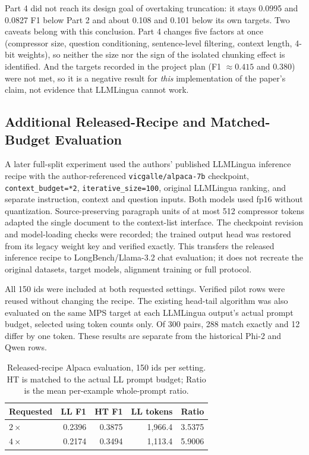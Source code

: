 \documentclass[10pt,a4paper,twocolumn]{article}
\begin{document}
Part 4 did not reach its design goal of overtaking truncation: it stays 0.0995 and 0.0827 F1 below Part 2 and about 0.108 and 0.101 below its own targets. Two caveats belong with this conclusion. Part 4 changes five factors at once
(compressor size, question conditioning, sentence-level filtering, context length,
4-bit weights), so neither the size nor the sign of the isolated chunking effect is identified. And the targets recorded in the project plan (F1 $\approx 0.415$ and $0.380$) were
not met, so it is a negative result for \emph{this} implementation of the paper's
claim, not evidence that LLMLingua cannot work.

\subsection{Additional Released-Recipe and Matched-Budget Evaluation}
\label{sec:matched}

A later full-split experiment used the authors' published LLMLingua inference
recipe with the author-referenced \texttt{vicgalle/alpaca-7b} checkpoint,
\texttt{context\_budget=*2}, \texttt{iterative\_size=100}, original LLMLingua
ranking, and separate instruction, context and question inputs. Both models used
fp16 without quantization. Source-preserving paragraph units of at most 512
compressor tokens adapted the single document to the context-list interface.
The checkpoint revision and model-loading checks were recorded; the trained output
head was restored from its legacy weight key and verified exactly. This transfers
the released inference recipe to LongBench/Llama-3.2 chat evaluation; it does not
recreate the original datasets, target models, alignment training or full protocol.

All 150 ids were included at both requested settings. Verified pilot rows were
reused without changing the recipe. The existing head-tail algorithm was also
evaluated on the same MPS target at each LLMLingua output's actual prompt budget,
selected using token counts only. Of 300 pairs, 288 match exactly and 12 differ
by one token. These results are separate from the historical Phi-2 and Qwen rows.

\begin{table}[t]
\centering\footnotesize
\setlength{\tabcolsep}{3pt}
\begin{tabular}{lrrrr}
\toprule
Requested & LL F1 & HT F1 & LL tokens & Ratio \\
\midrule
$2\times$ & 0.2396 & 0.3875 & 1{,}966.4 & 3.5375 \\
$4\times$ & 0.2174 & 0.3494 & 1{,}113.4 & 5.9006 \\
\bottomrule
\end{tabular}
\caption{Released-recipe Alpaca evaluation, 150 ids per setting. HT is matched
to the actual LL prompt budget; Ratio is the mean per-example whole-prompt ratio.}
\label{tab:matched}
\end{table}
\end{document}
